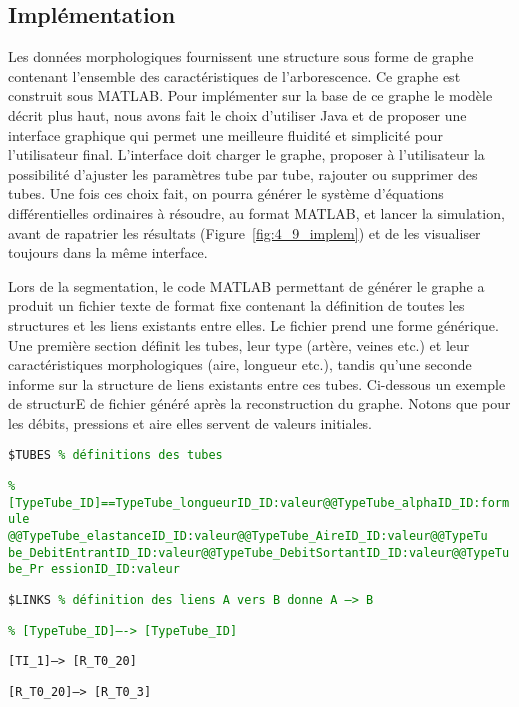 \subsection{Implémentation}
Les données morphologiques fournissent une structure sous forme de graphe contenant
l’ensemble des caractéristiques de l’arborescence. Ce graphe est construit sous MATLAB. Pour
implémenter sur la base de ce graphe le modèle décrit plus haut, nous avons fait le choix d’utiliser Java
et de proposer une interface graphique qui permet une meilleure fluidité et simplicité pour l’utilisateur
final. L’interface doit charger le graphe, proposer à l’utilisateur la possibilité d’ajuster les paramètres
tube par tube, rajouter ou supprimer des tubes. Une fois ces choix fait, on pourra générer le système
d’équations différentielles ordinaires à résoudre, au format MATLAB, et lancer la simulation, avant de
rapatrier les résultats (Figure~\ref{fig:4_9_implem}) et de les visualiser toujours dans la même interface.

Lors de la segmentation, le code MATLAB permettant de générer le graphe a produit un fichier texte
de format fixe contenant la définition de toutes les structures et les liens existants entre elles. Le fichier
prend une forme générique. Une première section définit les tubes, leur type (artère, veines etc.) et
leur caractéristiques morphologiques (aire, longueur etc.), tandis qu’une seconde informe sur la
structure de liens existants entre ces tubes. Ci-dessous un exemple de structurE de fichier généré après la reconstruction du graphe. Notons que pour les débits, pressions et aire elles
servent de valeurs initiales.

\vspace{0.4cm}
{\tt \$TUBES \textcolor{green}{\% définitions des tubes}}

{\tt \textcolor{green}{\% [TypeTube\_ID]==TypeTube\_longueurID\_ID:valeur@@TypeTube\_alphaID\_ID:formule
@@TypeTube\_elastanceID\_ID:valeur@@TypeTube\_AireID\_ID:valeur@@TypeTu
be\_DebitEntrantID\_ID:valeur@@TypeTube\_DebitSortantID\_ID:valeur@@TypeTube\_Pr
essionID\_ID:valeur}}

{\tt \$LINKS \textcolor{green}{\% définition des liens A vers B donne A --> B}}

{\tt \textcolor{green}{\% [TypeTube\_ID]—-> [TypeTube\_ID]}}

{\tt [TI\_1]--> [R\_T0\_20]}

{\tt [R\_T0\_20]--> [R\_T0\_3]}

